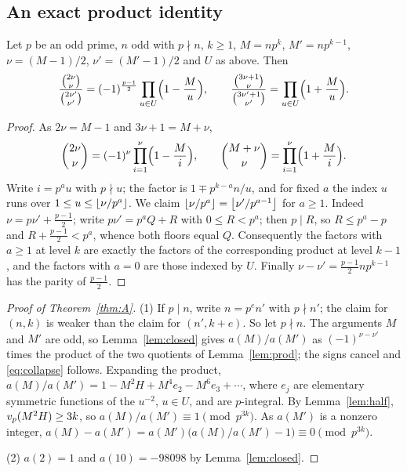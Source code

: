 \documentclass[11pt]{amsart}
\begin{document}
\subsection{An exact product identity}
\begin{lemma}\label{lem:prod}
Let $p$ be an odd prime, $n$ odd with $p\nmid n$, $k\ge1$, $M=np^k$, $M'=np^{k-1}$, $\nu=(M-1)/2$, $\nu'=(M'-1)/2$ and $U$ as above. Then
\[ \frac{\binom{2\nu}{\nu}}{\binom{2\nu'}{\nu'}}=(-1)^{\frac{p-1}2}\prod_{u\in U}\Bigl(1-\frac Mu\Bigr),\qquad \frac{\binom{3\nu+1}{\nu}}{\binom{3\nu'+1}{\nu'}}=\prod_{u\in U}\Bigl(1+\frac Mu\Bigr). \]
\end{lemma}
\begin{proof}
As $2\nu=M-1$ and $3\nu+1=M+\nu$,
\[ \binom{2\nu}\nu=(-1)^\nu\prod_{i=1}^\nu\Bigl(1-\frac Mi\Bigr),\qquad\binom{M+\nu}{\nu}=\prod_{i=1}^\nu\Bigl(1+\frac Mi\Bigr). \]
Write $i=p^au$ with $p\nmid u$; the factor is $1\mp p^{k-a}n/u$, and for fixed $a$ the index $u$ runs over $1\le u\le\left\lfloor \nu/p^a\right\rfloor$. We claim $\left\lfloor \nu/p^a\right\rfloor=\left\lfloor \nu'/p^{a-1}\right\rfloor$ for $a\ge1$. Indeed $\nu=p\nu'+\frac{p-1}2$; write $p\nu'=p^aQ+R$ with $0\le R<p^a$; then $p\mid R$, so $R\le p^a-p$ and $R+\frac{p-1}2<p^a$, whence both floors equal $Q$. Consequently the factors with $a\ge1$ at level $k$ are exactly the factors of the corresponding product at level $k-1$, and the factors with $a=0$ are those indexed by $U$. Finally $\nu-\nu'=\frac{p-1}2np^{k-1}$ has the parity of $\frac{p-1}2$.
\end{proof}

\begin{proof}[Proof of Theorem~\ref{thm:A}]
(1) If $p\mid n$, write $n=p^en'$ with $p\nmid n'$; the claim for $(n,k)$ is weaker than the claim for $(n',k+e)$. So let $p\nmid n$. The arguments $M$ and $M'$ are odd, so Lemma~\ref{lem:closed} gives $a(M)/a(M')$ as $(-1)^{\nu-\nu'}$ times the product of the two quotients of Lemma~\ref{lem:prod}; the signs cancel and \eqref{eq:collapse} follows. Expanding the product, $a(M)/a(M')=1-M^2H+M^4e_2-M^6e_3+\cdots$, where $e_j$ are elementary symmetric functions of the $u^{-2}$, $u\in U$, and are $p$-integral. By Lemma~\ref{lem:half}, $v_p(M^2H)\ge3k$, so $a(M)/a(M')\equiv1\pmod{p^{3k}}$. As $a(M')$ is a nonzero integer, $a(M)-a(M')=a(M')\bigl(a(M)/a(M')-1\bigr)\equiv0\pmod{p^{3k}}$.

(2) $a(2)=1$ and $a(10)=-98098$ by Lemma~\ref{lem:closed}.
\end{proof}
\end{document}
